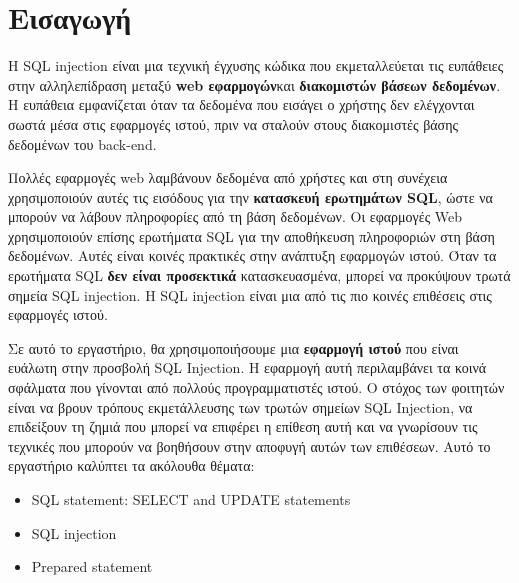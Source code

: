 %
%
\section*{Εισαγωγή}
\noindent
Η SQL injection είναι μια τεχνική έγχυσης κώδικα που εκμεταλλεύεται τις ευπάθειες
στην αλληλεπίδραση μεταξύ \textbf{web εφαρμογών}και \textbf{διακομιστών βάσεων δεδομένων}.
Η ευπάθεια εμφανίζεται όταν τα δεδομένα που εισάγει ο χρήστης δεν ελέγχονται
σωστά μέσα στις εφαρμογές ιστού, πριν να σταλούν στους διακομιστές βάσης
δεδομένων του back-end.

\noindent
Πολλές εφαρμογές web λαμβάνουν δεδομένα από χρήστες και στη συνέχεια
χρησιμοποιούν αυτές τις εισόδους για την \textbf{κατασκευή ερωτημάτων SQL}, ώστε να
μπορούν να λάβουν πληροφορίες από τη βάση δεδομένων. Οι εφαρμογές Web
χρησιμοποιούν επίσης ερωτήματα SQL για την αποθήκευση πληροφοριών στη βάση
δεδομένων. Αυτές είναι κοινές πρακτικές στην ανάπτυξη εφαρμογών ιστού. Όταν τα
ερωτήματα SQL \textbf{δεν είναι προσεκτικά} κατασκευασμένα, μπορεί να προκύψουν
τρωτά σημεία SQL injection. Η SQL injection είναι μια από τις πιο κοινές επιθέσεις
στις εφαρμογές ιστού.

\noindent
Σε αυτό το εργαστήριο, θα χρησιμοποιήσουμε μια \textbf{εφαρμογή ιστού} που είναι
ευάλωτη στην προσβολή SQL Injection. Η εφαρμογή αυτή περιλαμβάνει τα κοινά
σφάλματα που γίνονται από πολλούς προγραμματιστές ιστού. Ο στόχος των
φοιτητών είναι να βρουν τρόπους εκμετάλλευσης των τρωτών σημείων SQL Injection,
να επιδείξουν τη ζημιά που μπορεί να επιφέρει η επίθεση αυτή και να γνωρίσουν τις
τεχνικές που μπορούν να βοηθήσουν στην αποφυγή αυτών των επιθέσεων. Αυτό το
εργαστήριο καλύπτει τα ακόλουθα θέματα:
\begin{itemize}
	\item SQL statement: SELECT and UPDATE statements
	\item SQL injection
	\item Prepared statement
\end{itemize}